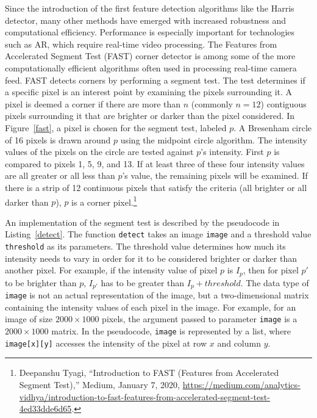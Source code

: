 Since the introduction of the first feature detection algorithms like the Harris detector, many other methods have emerged with increased robustness and computational efficiency. Performance is especially important for technologies such as AR, which require real-time video processing. The Features from Accelerated Segment Test (FAST) corner detector is among some of the more computationally efficient algorithms often used in processing real-time camera feed. FAST detects corners by performing a segment test. The test determines if a specific pixel is an interest point by examining the pixels surrounding it. A pixel is deemed a corner if there are more than $n$ (commonly $n = 12$) contiguous pixels surrounding it that are brighter or darker than the pixel considered. In Figure~\ref{fast}, a pixel is chosen for the segment test, labeled $p$. A Bresenham circle of 16 pixels is drawn around $p$ using the midpoint circle algorithm. The intensity values of the pixels on the circle are tested against $p$'s intensity. First $p$ is compared to pixels 1, 5, 9, and 13.  If at least three of these four intensity values are all greater or all less than $p$'s value, the remaining pixels will be examined. If there is a strip of 12 continuous pixels that satisfy the criteria (all brighter or all darker than $p$), $p$ is a corner pixel.\footnote{Deepanshu Tyagi, “Introduction to FAST (Features from Accelerated Segment Test),” Medium, January 7, 2020, \url{https://medium.com/analytics-vidhya/introduction-to-fast-features-from-accelerated-segment-test-4ed33dde6d65}.}

\begin{figure}[!ht]
\end{figure}

An implementation of the segment test is described by the pseudocode in Listing~\ref{detect}. The function \texttt{detect} takes an image \texttt{image} and a threshold value \texttt{threshold} as its parameters. The threshold value determines how much its intensity needs to vary in order for it to be considered brighter or darker than another pixel. For example, if the intensity value of pixel $p$ is $I_p$, then for pixel $p'$ to be brighter than $p$, $I_{p'}$ has to be greater than $I_p + threshold$. The data type of \texttt{image} is not an actual representation of the image, but a two-dimensional matrix containing the intensity values of each pixel in the image. For example, for an image of size $2000 \times 1000$ pixels, the argument passed to parameter \texttt{image} is a $2000 \times 1000$ matrix. In the pseudocode, \texttt{image} is represented by a list, where \texttt{image[x][y]} accesses the intensity of the pixel at row $x$ and column $y$.

